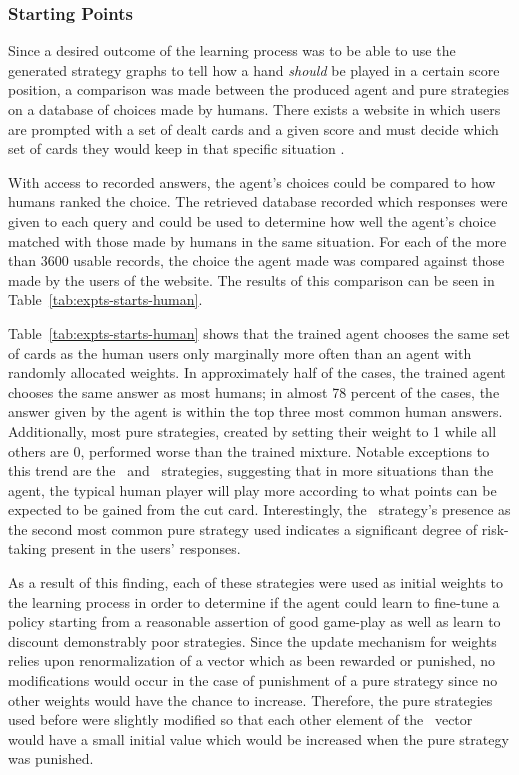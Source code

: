 

\subsubsection*{Starting Points}
\label{sec:findings-expts-starts}

Since a desired outcome of the learning process was to be able to use the
generated strategy graphs to tell how a hand \textit{should} be played in a
certain score position,
a comparison was made between the produced agent and pure strategies
on a database of choices made by humans.
%
There exists a website in which users are prompted with a set of dealt cards and
a given score and must decide which set of cards they would keep in that
specific situation
\cite{dailycribbagehand}.

With access to recorded answers,
the agent's choices could be compared to how humans ranked the choice.
%
The retrieved database recorded which responses were given to each query
and could be used to determine how well the agent's choice matched with those
made by humans in the same situation.
%
For each of the more than 3600 usable records,
the choice the agent made was compared against those made by the users of the
website.
%
The results of this comparison can be seen in
Table~\ref{tab:expts-starts-human}. %

Table~\ref{tab:expts-starts-human} shows that the trained agent chooses the same
set of cards as the human users only marginally more often than an agent with 
randomly allocated weights.
%
In approximately half of the cases,
the trained agent chooses the same answer as most humans;
in almost 78 percent of the cases,
the answer given by the agent is within the top three most common human answers.
%
Additionally,
most pure strategies,
created by setting their weight to 1 while all others are 0,
performed worse than the trained mixture.
%
Notable exceptions to this trend are the \handmaxposs\ and \handmaxavg\ 
strategies,
suggesting that in more situations than the agent,
the typical human player will play more according to what points can be expected
to be gained from the cut card.
%
Interestingly,
the \handmaxposs\ strategy's presence as the second most common pure strategy
used indicates a significant degree of risk-taking present in the users'
responses.

As a result of this finding,
each of these strategies were used as initial weights to the learning process
in order to determine if the agent could learn to fine-tune a policy starting
from a reasonable assertion of good game-play
as well as learn to discount demonstrably poor strategies.
%
Since the update mechanism for weights relies upon renormalization of a vector
which as been rewarded or punished,
no modifications would occur in the case of punishment of a pure strategy
since no other weights would have the chance to increase.
%
Therefore,
the pure strategies used before were slightly modified so that each other
element of the \wvec\ vector would have a small initial value which would be
increased when the pure strategy was punished.

